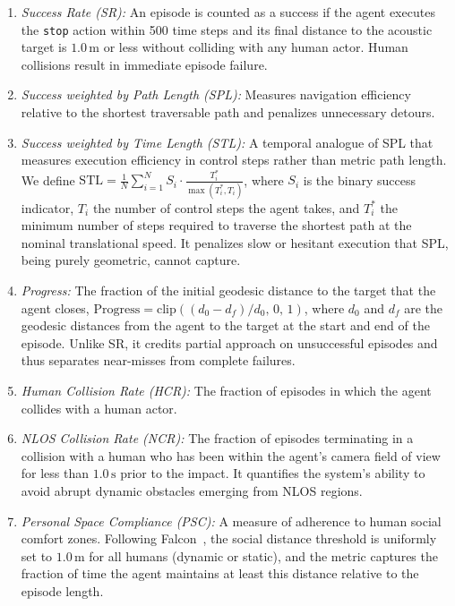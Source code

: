 \begin{enumerate}
	\item \textit{Success Rate (SR):} An episode is counted as a success if the agent executes the \texttt{stop} action within 500 time steps and its final distance to the acoustic target is $1.0\,\mathrm{m}$ or less without colliding with any human actor. Human collisions result in immediate episode failure.
	\item \textit{Success weighted by Path Length (SPL):} Measures navigation efficiency relative to the shortest traversable path and penalizes unnecessary detours.
	\item \textit{Success weighted by Time Length (STL):} A temporal analogue of SPL that measures execution efficiency in control steps rather than metric path length. We define $\mathrm{STL} = \frac{1}{N}\sum_{i=1}^{N} S_i \cdot \frac{T_i^*}{\max(T_i^*, T_i)}$, where $S_i$ is the binary success indicator, $T_i$ the number of control steps the agent takes, and $T_i^*$ the minimum number of steps required to traverse the shortest path at the nominal translational speed. It penalizes slow or hesitant execution that SPL, being purely geometric, cannot capture.
	\item \textit{Progress:} The fraction of the initial geodesic distance to the target that the agent closes, $\mathrm{Progress} = \mathrm{clip}\!\left((d_0 - d_f)/d_0,\, 0,\, 1\right)$, where $d_0$ and $d_f$ are the geodesic distances from the agent to the target at the start and end of the episode. Unlike SR, it credits partial approach on unsuccessful episodes and thus separates near-misses from complete failures.
	\item \textit{Human Collision Rate (HCR):} The fraction of episodes in which the agent collides with a human actor.
	\item \textit{NLOS Collision Rate (NCR):} The fraction of episodes terminating in a collision with a human who has been within the agent's camera field of view for less than $1.0\,\mathrm{s}$ prior to the impact. It quantifies the system's ability to avoid abrupt dynamic obstacles emerging from NLOS regions.
	\item \textit{Personal Space Compliance (PSC):} A measure of adherence to human social comfort zones. Following Falcon~\cite{CognitionPrecognitionFutureaware2025}, the social distance threshold is uniformly set to $1.0\,\mathrm{m}$ for all humans (dynamic or static), and the metric captures the fraction of time the agent maintains at least this distance relative to the episode length.
\end{enumerate}

